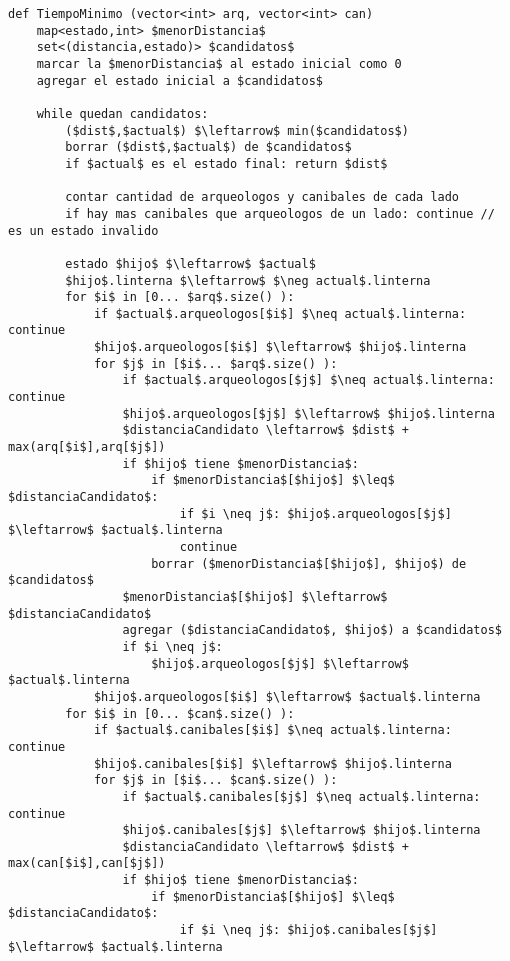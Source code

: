 \begin{lstlisting}
def TiempoMinimo (vector<int> arq, vector<int> can)
    map<estado,int> $menorDistancia$
    set<(distancia,estado)> $candidatos$
    marcar la $menorDistancia$ al estado inicial como 0
    agregar el estado inicial a $candidatos$

    while quedan candidatos:
        ($dist$,$actual$) $\leftarrow$ min($candidatos$)
        borrar ($dist$,$actual$) de $candidatos$
        if $actual$ es el estado final: return $dist$

        contar cantidad de arqueologos y canibales de cada lado
        if hay mas canibales que arqueologos de un lado: continue // es un estado invalido

        estado $hijo$ $\leftarrow$ $actual$
        $hijo$.linterna $\leftarrow$ $\neg actual$.linterna
        for $i$ in [0... $arq$.size() ):
            if $actual$.arqueologos[$i$] $\neq actual$.linterna: continue
            $hijo$.arqueologos[$i$] $\leftarrow$ $hijo$.linterna
            for $j$ in [$i$... $arq$.size() ):
                if $actual$.arqueologos[$j$] $\neq actual$.linterna: continue
                $hijo$.arqueologos[$j$] $\leftarrow$ $hijo$.linterna
                $distanciaCandidato \leftarrow$ $dist$ + max(arq[$i$],arq[$j$])
                if $hijo$ tiene $menorDistancia$:
                    if $menorDistancia$[$hijo$] $\leq$ $distanciaCandidato$:
                        if $i \neq j$: $hijo$.arqueologos[$j$] $\leftarrow$ $actual$.linterna
                        continue
                    borrar ($menorDistancia$[$hijo$], $hijo$) de $candidatos$
                $menorDistancia$[$hijo$] $\leftarrow$ $distanciaCandidato$
                agregar ($distanciaCandidato$, $hijo$) a $candidatos$
                if $i \neq j$:
                    $hijo$.arqueologos[$j$] $\leftarrow$ $actual$.linterna
            $hijo$.arqueologos[$i$] $\leftarrow$ $actual$.linterna
        for $i$ in [0... $can$.size() ):
            if $actual$.canibales[$i$] $\neq actual$.linterna: continue
            $hijo$.canibales[$i$] $\leftarrow$ $hijo$.linterna
            for $j$ in [$i$... $can$.size() ):
                if $actual$.canibales[$j$] $\neq actual$.linterna: continue
                $hijo$.canibales[$j$] $\leftarrow$ $hijo$.linterna
                $distanciaCandidato \leftarrow$ $dist$ + max(can[$i$],can[$j$])
                if $hijo$ tiene $menorDistancia$:
                    if $menorDistancia$[$hijo$] $\leq$ $distanciaCandidato$:
                        if $i \neq j$: $hijo$.canibales[$j$] $\leftarrow$ $actual$.linterna

\end{lstlisting}
